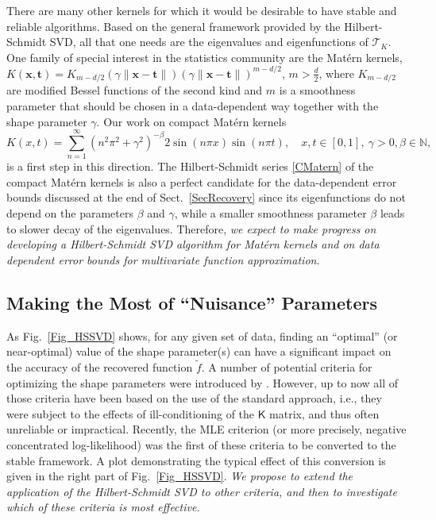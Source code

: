 \documentclass[11pt]{NSFamsart}
\newcommand{\tf}{\tilde{f}}
\newcommand{\mK}{\mathsf{K}}
\newcommand{\bx}{{\boldsymbol{x}}}
\newcommand{\bt}{{\boldsymbol{t}}}
\newcommand{\cT}{\mathcal{T}}
\begin{document}
There are many other kernels for which it would be desirable to have stable and reliable algorithms. Based on the general framework provided by the Hilbert-Schmidt SVD, all that one needs are the eigenvalues and eigenfunctions of $\cT_K$. One family of special interest in the statistics community \citep{Ste99} are the Mat\'ern kernels, $K(\bx,\bt) = K_{m-d/2}\left(\gamma\|\bx-\bt\|\right) \left( \gamma \| \bx - \bt \|\right)^{m-d/2}$, $m > \frac d2$,
where $K_{m-d/2}$ are modified Bessel functions of the second kind and $m$ is a smoothness parameter that should be chosen in a data-dependent way together with the shape parameter $\gamma$. Our work on compact Mat\'ern kernels \citep{CFMcC13}
\begin{equation}\label{CMatern}
K(x,t) = \sum_{n=1}^{\infty} \left(n^2\pi^2 + \gamma^2\right)^{-\beta} 2\sin(n\pi x) \sin(n\pi t), \quad x,t \in [0,1],\ \gamma>0, \beta \in \mathbb{N},
\end{equation}
is a first step in this direction. The Hilbert-Schmidt series \eqref{CMatern} of the compact Mat\'ern kernels is also a perfect candidate for the data-dependent error bounds discussed at the end of Sect.~\ref{SecRecovery} since its eigenfunctions do not depend on the parameters $\beta$ and $\gamma$, while a smaller smoothness parameter $\beta$ leads to slower decay of the eigenvalues. Therefore, \emph{we expect to make progress on developing a Hilbert-Schmidt SVD algorithm for Mat\'ern kernels and on data dependent error bounds for multivariate function approximation}.


\subsection{Making the Most of ``Nuisance'' Parameters}
As Fig.~\ref{Fig_HSSVD} shows, for any given set of data, finding an ``optimal'' (or near-optimal) value of the shape parameter(s) can have a significant impact on the accuracy of the recovered function $\tf$. A number of potential criteria for optimizing the shape parameters were introduced by \cite{Fasshauer11}. However, up to now all of those criteria have been based on the use of the standard approach, i.e., they were subject to the effects of ill-conditioning of the $\mK$ matrix, and thus often unreliable or impractical. Recently, the MLE criterion (or more precisely, negative concentrated log-likelihood) was the first of these criteria to be converted to the stable framework. A plot demonstrating the typical effect of this conversion is given in the right part of Fig.~\ref{Fig_HSSVD}. \emph{We propose to extend the application of the Hilbert-Schmidt SVD to other criteria, and then to investigate which of these criteria is most effective.}
\end{document}

